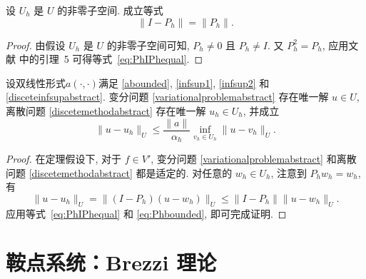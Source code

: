 \begin{lemma}
设 $U_h$ 是 $U$ 的非零子空间. 成立等式
\begin{equation}\label{eq:PhIPhequal}
\|I-P_h\|=\|P_h\|.
\end{equation}
\end{lemma}
\begin{proof}
由假设 $U_h$ 是 $U$ 的非零子空间可知, $P_h\neq 0$ 且 $P_h\neq I$. 又 $P_h^2=P_h$, 应用文献 \cite{XuZikatanov2003} 中的引理~5 可得等式~\eqref{eq:PhIPhequal}.
\end{proof}

\begin{theorem}[C\'ea引理]
设双线性形式$a(\cdot, \cdot)$满足 \eqref{abounded}, \eqref{infsup1}, \eqref{infsup2} 和 \eqref{disceteinfsupabstract}. 变分问题 \eqref{variationalproblemabstract} 存在唯一解 $u\in U$, 离散问题 \eqref{discetemethodabstract} 存在唯一解 $u_h\in U_h$, 并成立
\[
\|u-u_h\|_U\leq\frac{\|a\|}{\alpha_h}\inf_{v_h\in U_h}\|u-v_h\|_U.
\]
\end{theorem}
\begin{proof}
在定理假设下, 对于 $f\in V'$, 变分问题 \eqref{variationalproblemabstract} 和离散问题 \eqref{discetemethodabstract} 都是适定的. 
对任意的 $w_h\in U_h$, 注意到 $P_hw_h = w_h$, 有
\[
\|u-u_h\|_U=\|(I-P_h)(u-w_h)\|_U\leq\|I-P_h\|\|u-w_h\|_U.
\]
应用等式~\eqref{eq:PhIPhequal} 和 \eqref{eq:Phbounded}, 
即可完成证明.
\end{proof}



\section{鞍点系统：Brezzi 理论}

